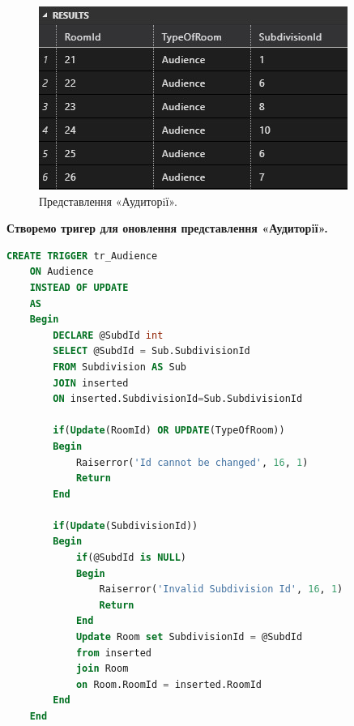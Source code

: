 \documentclass[a4paper,12pt]{article}
\begin{document}
\newpage
	\begin{figure}[h!]
		\begin{minipage}[h]{1\linewidth}
			\centering
			\includegraphics[width=0.6\linewidth]{Prt sc/Figure_2.jpg}  
		\end{minipage}
		\caption{Представлення «Аудиторiї».}
	\end{figure}
	\begin{center}
		\textbf{Створемо тригер для оновлення представлення «Аудиторiї».}
	\end{center}
	\begin{lstlisting}[language=SQL]
	CREATE TRIGGER tr_Audience
	ON Audience
	INSTEAD OF UPDATE
	AS
	Begin
		DECLARE @SubdId int
		SELECT @SubdId = Sub.SubdivisionId
		FROM Subdivision AS Sub
		JOIN inserted
		ON inserted.SubdivisionId=Sub.SubdivisionId
	
		if(Update(RoomId) OR UPDATE(TypeOfRoom))
		Begin
			Raiserror('Id cannot be changed', 16, 1)
			Return
		End
		
		if(Update(SubdivisionId))
		Begin
			if(@SubdId is NULL)
			Begin
				Raiserror('Invalid Subdivision Id', 16, 1)
				Return
			End
			Update Room set SubdivisionId = @SubdId
			from inserted
			join Room
			on Room.RoomId = inserted.RoomId
		End
	End
	\end{lstlisting}
\end{document}
